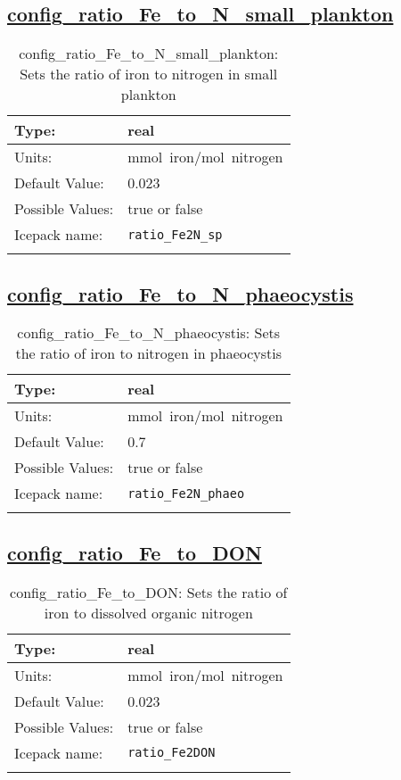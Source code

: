 \subsection[config\_ratio\_Fe\_to\_N\_small\_plankton]{\hyperref[sec:nm_tab_biogeochemistry]{config\_ratio\_Fe\_to\_N\_small\_plankton}}
\label{subsec:nm_sec_config_ratio_Fe_to_N_small_plankton}
\begin{center}
\begin{longtable}{| p{2.0in} || p{4.0in} |}
    \hline
    Type: & real \\
    \hline
    Units: & \si{mmol.iron/mol.nitrogen} \\
    \hline
    Default Value: & 0.023 \\
    \hline
    Possible Values: & true or false \\
    \hline
    Icepack name: & \verb+ratio_Fe2N_sp+ \\
    \hline
    \caption{config\_ratio\_Fe\_to\_N\_small\_plankton: Sets the ratio of iron to nitrogen in small plankton}
\end{longtable}
\end{center}
\subsection[config\_ratio\_Fe\_to\_N\_phaeocystis]{\hyperref[sec:nm_tab_biogeochemistry]{config\_ratio\_Fe\_to\_N\_phaeocystis}}
\label{subsec:nm_sec_config_ratio_Fe_to_N_phaeocystis}
\begin{center}
\begin{longtable}{| p{2.0in} || p{4.0in} |}
    \hline
    Type: & real \\
    \hline
    Units: & \si{mmol.iron/mol.nitrogen} \\
    \hline
    Default Value: & 0.7 \\
    \hline
    Possible Values: & true or false \\
    \hline
    Icepack name: & \verb+ratio_Fe2N_phaeo+ \\
    \hline
    \caption{config\_ratio\_Fe\_to\_N\_phaeocystis: Sets the ratio of iron to nitrogen in phaeocystis}
\end{longtable}
\end{center}
\subsection[config\_ratio\_Fe\_to\_DON]{\hyperref[sec:nm_tab_biogeochemistry]{config\_ratio\_Fe\_to\_DON}}
\label{subsec:nm_sec_config_ratio_Fe_to_DON}
\begin{center}
\begin{longtable}{| p{2.0in} || p{4.0in} |}
    \hline
    Type: & real \\
    \hline
    Units: & \si{mmol.iron/mol.nitrogen} \\
    \hline
    Default Value: & 0.023 \\
    \hline
    Possible Values: & true or false \\
    \hline
    Icepack name: & \verb+ratio_Fe2DON+ \\
    \hline
    \caption{config\_ratio\_Fe\_to\_DON: Sets the ratio of iron to dissolved organic nitrogen}
\end{longtable}
\end{center}
